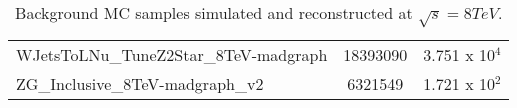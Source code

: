\begin{table}[h!]
\begin{center}
{\begin{tabular}{lcc}
WJetsToLNu\_TuneZ2Star\_8TeV-madgraph & 18393090 & 3.751 x 10$^{4}$\\	
ZG\_Inclusive\_8TeV-madgraph\_v2 & 6321549 & 1.721 x 10$^{2}$\\	
\hline
\end{tabular}
}
\caption{Background MC samples simulated and reconstructed at $\sqrt{s}=8\unit{TeV}$. 
}
   \label{Table:BkgSamples}
\end{center}
\end{table}

